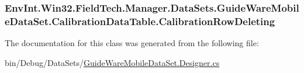 \subsubsection[{Calibration\+Row\+Deleting}]{ Env\+Int.\+Win32.\+Field\+Tech.\+Manager.\+Data\+Sets.\+Guide\+Ware\+Mobile\+Data\+Set.\+Calibration\+Data\+Table.\+Calibration\+Row\+Deleting}\label{class_env_int_1_1_win32_1_1_field_tech_1_1_manager_1_1_data_sets_1_1_guide_ware_mobile_data_set_1_1_calibration_data_table_af7bb15c7ae5084efa899cfb0595513b0}


The documentation for this class was generated from the following file\+:\begin{DoxyCompactItemize}
\item 
bin/\+Debug/\+Data\+Sets/\hyperlink{bin_2_debug_2_data_sets_2_guide_ware_mobile_data_set_8_designer_8cs}{Guide\+Ware\+Mobile\+Data\+Set.\+Designer.\+cs}\end{DoxyCompactItemize}
